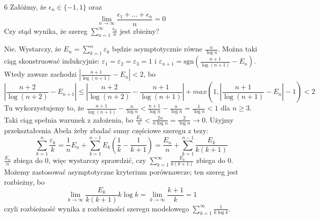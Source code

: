 \documentclass{../note}
\begin{document}
\begin{zadanie}{6}
Załóżmy, że $\epsilon_{n}\in\{-1,1\}$ oraz
$$ \lim_{n\rightarrow\infty}\frac{\epsilon_{1}+...+\epsilon_{n}}{n}=0 $$
Czy stąd wynika, że szereg $\sum_{n=1}^{\infty}\frac{\epsilon_{n}}{n}$ jest zbieżny?
\end{zadanie}
\begin{rozwiazanie}
Nie. Wystarczy, że $E_n = \sum_{k=1}^{n} \varepsilon_k$ będzie asymptotycznie równe $\frac{n}{\log n}$. Można taki ciąg skonstruować indukcyjnie: $\varepsilon_1 = \varepsilon_2 = \varepsilon_3 = 1$ i $\varepsilon_{n+1} = \text{sgn}\left(\frac{n+1}{\log(n+1)} - E_n\right)$. Wtedy zawsze zachodzi $\left|\frac{n+1}{\log(n+1)} - E_n\right| < 2$, bo
\[\left|\frac{n+2}{\log(n+2)} - E_{n+1}\right| \leq \left|\frac{n+2}{\log(n+2)} - \frac{n+1}{\log(n+1)}\right| + max\left(1, \left|\frac{n+1}{\log(n+1)} - E_n\right| - 1\right) < 2\]
Tu wykorzystujemy to, że $\frac{n+1}{\log(n+1)} - \frac{n}{\log n} < \frac{n+1}{\log n} - \frac{n}{\log n} = \frac{1}{\log n} < 1$ dla $n \geq 3$. Taki ciąg spełnia warunek z założenia, bo $\frac{E_n}{n} < \frac{2n}{n\log n} = \frac{2}{\log n} \to 0$. Użyjmy przekształcenia Abela żeby zbadać sumy częściowe szeregu z tezy:
\[\sum_{k=1}^{n}\frac{\varepsilon_k}{k} = \frac{1}{n}E_n + \sum_{k=1}^{n-1}E_k\left(\frac1k - \frac{1}{k+1}\right) = \frac{E_n}{n} + \sum_{k=1}^{n-1}\frac{E_k}{k(k+1)}\]
$\frac{E_n}{n}$ zbiega do 0, więc wystarczy sprawdzić, czy $\sum_{k=1}^{\infty}\frac{E_k}{k(k+1)}$ zbiega do 0. Możemy zastosować asymptotyczne kryterium porównawcze; ten szereg jest rozbieżny, bo \[\lim_{k\to\infty} \frac{E_k}{k(k+1)}k\log k = \lim_{k\to\infty} \frac{k+1}{k} = 1\] czyli rozbieżność wynika z rozbieżności szeregu modelowego $\sum_{k=1}^{\infty}\frac{1}{k\log k}$.
\end{rozwiazanie}
\end{document}

